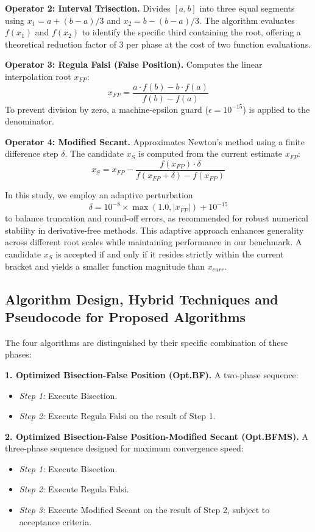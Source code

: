\documentclass[amsmath, amssymb, aps]{revtex4-2}
\begin{document}
\textbf{Operator 2: Interval Trisection.}
Divides $[a, b]$ into three equal segments using $x_1 = a + (b-a)/3$ and $x_2 = b - (b-a)/3$. The algorithm evaluates $f(x_1)$ and $f(x_2)$ to identify the specific third containing the root, offering a theoretical reduction factor of $3$ per phase at the cost of two function evaluations.

\textbf{Operator 3: Regula Falsi (False Position).}
Computes the linear interpolation root $x_{FP}$:
\begin{equation}
    x_{FP} = \frac{a \cdot f(b) - b \cdot f(a)}{f(b) - f(a)}
\end{equation}
To prevent division by zero, a machine-epsilon guard ($\epsilon = 10^{-15}$) is applied to the denominator.

\textbf{Operator 4: Modified Secant.}
Approximates Newton's method using a finite difference step $\delta$. The candidate $x_S$ is computed from the current estimate $x_{FP}$:
\begin{equation}
    x_S = x_{FP} - \frac{f(x_{FP}) \cdot \delta}{f(x_{FP} + \delta) - f(x_{FP})}
\end{equation}

In this study, we employ an adaptive perturbation $$ \delta = 10^{-8} \times \max(1.0, |x_{FP}|) + 10^{-15} $$ to balance truncation and round-off errors, as recommended for robust numerical stability in derivative-free methods. This adaptive approach enhances generality across different root scales while maintaining performance in our benchmark. A candidate $ x_S $ is accepted if and only if it resides strictly within the current bracket and yields a smaller function magnitude than $ x_{curr} $.

\subsection{Algorithm Design, Hybrid Techniques and Pseudocode for Proposed Algorithms}

The four algorithms are distinguished by their specific combination of these phases:

\textbf{1. Optimized Bisection-False Position (Opt.BF).}
A two-phase sequence:
\begin{itemize}
    \item \textit{Step 1:} Execute Bisection.
    \item \textit{Step 2:} Execute Regula Falsi on the result of Step 1.
\end{itemize}

\textbf{2. Optimized Bisection-False Position-Modified Secant (Opt.BFMS).}
A three-phase sequence designed for maximum convergence speed:
\begin{itemize}
    \item \textit{Step 1:} Execute Bisection.
    \item \textit{Step 2:} Execute Regula Falsi.
    \item \textit{Step 3:} Execute Modified Secant on the result of Step 2, subject to acceptance criteria.
\end{itemize}
\end{document}

